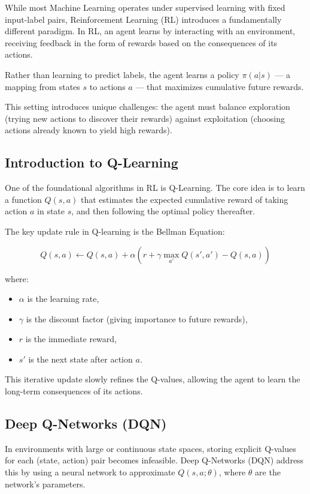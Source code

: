 \documentclass[openany]{book}
\begin{document}
While most Machine Learning operates under supervised learning with fixed 
input-label pairs, Reinforcement Learning (RL) introduces a fundamentally 
different paradigm. In RL, an agent learns by interacting with an environment, 
receiving feedback in the form of rewards based on the consequences of its 
actions.

Rather than learning to predict labels, the agent learns a policy $\pi(a|s)$ — a 
mapping from states $s$ to actions $a$ — that maximizes cumulative future 
rewards.

This setting introduces unique challenges: the agent must balance exploration 
(trying new actions to discover their rewards) against exploitation (choosing 
actions already known to yield high rewards).

\subsection{Introduction to Q-Learning}

One of the foundational algorithms in RL is Q-Learning. The core idea is to 
learn a function $Q(s,a)$ that estimates the expected cumulative reward of 
taking action $a$ in state $s$, and then following the optimal policy 
thereafter.

The key update rule in Q-learning is the Bellman Equation:

\begin{equation}
Q(s,a) \leftarrow Q(s,a) + \alpha \left( r + 
\gamma \max_{a'} Q(s',a') - Q(s,a) \right)
\end{equation}

where:
\begin{itemize}
    \item $\alpha$ is the learning rate,
    \item $\gamma$ is the discount factor (giving importance to future rewards),
    \item $r$ is the immediate reward,
    \item $s'$ is the next state after action $a$.
\end{itemize}

This iterative update slowly refines the Q-values, allowing the agent to learn 
the long-term consequences of its actions.

\subsection{Deep Q-Networks (DQN)}

In environments with large or continuous state spaces, storing explicit Q-values 
for each (state, action) pair becomes infeasible. Deep Q-Networks (DQN) address 
this by using a neural network to approximate $Q(s, a; \theta)$, where $\theta$ 
are the network's parameters.
\end{document}
